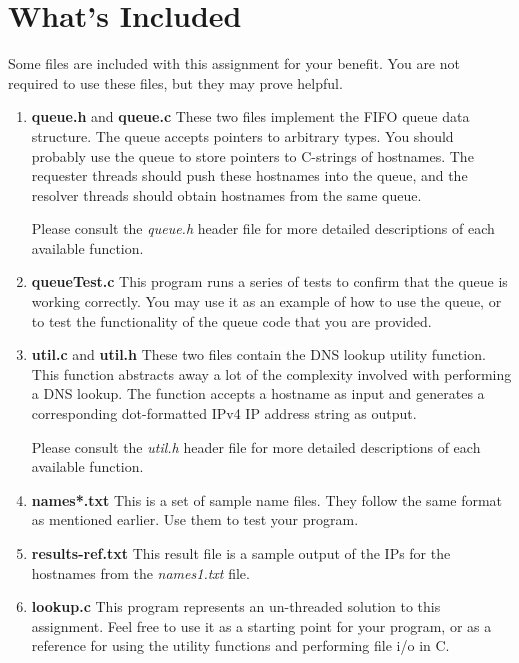 \documentclass[12pt]{article}
\begin{document}
\section{What's Included}
Some files are included with this assignment for your benefit. You are
not required to use these files, but they may prove helpful.
\begin{enumerate}
\item {\bf queue.h} and {\bf queue.c} These two files implement the
  FIFO queue data structure. The queue accepts pointers to arbitrary
  types. You should probably use the queue to store pointers to
  C-strings of hostnames. The requester threads should push these
  hostnames into the
  queue, and the resolver threads should obtain hostnames from the same
  queue.

  Please consult the \textit{queue.h} header file for more detailed
  descriptions of each available function.

\item {\bf queueTest.c} This program runs a series of tests to confirm
  that the queue is working correctly. You may use it as an example of
  how to use the queue, or to test the functionality of the queue code
  that you are provided.

\item {\bf util.c} and {\bf util.h} These two files contain the DNS lookup
  utility function. This function abstracts away a lot of the
  complexity involved with performing a DNS lookup. The function
  accepts a hostname as input and generates a corresponding
  dot-formatted IPv4 IP address string as output.
  
  Please consult the \textit{util.h} header file for more detailed
  descriptions of each available function.
  
\item {\bf names*.txt} This is a set of sample name files.
  They follow the same format as mentioned earlier. Use them to test
  your program.

\item {\bf results-ref.txt} This result file is a sample output of the IPs
  for the hostnames from the \textit{names1.txt} file.

\item {\bf lookup.c} This program represents an un-threaded solution to
  this assignment. Feel free to use it as a starting point for your
  program, or as a reference for using the utility functions and
  performing file i/o in C.

\end{enumerate}
\end{document}
